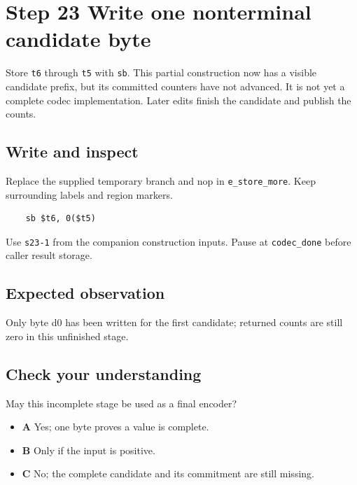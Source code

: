 \section{Step 23 Write one nonterminal candidate byte}\label{delta-s23}

Store \texttt{t6} through \texttt{t5} with \texttt{sb}. This partial construction now has a visible candidate prefix, but its committed counters have not advanced. It is not yet a complete codec implementation. Later edits finish the candidate and publish the counts.

\subsection{Write and inspect}
Replace the supplied temporary branch and nop in \texttt{e\_store\_more}. Keep surrounding labels and region markers.

\begin{verbatim}
    sb $t6, 0($t5)
\end{verbatim}
Use \texttt{s23-1} from the companion construction inputs. Pause at \texttt{codec\_done} before caller result storage.

\subsection{Expected observation}
Only byte d0 has been written for the first candidate; returned counts are still zero in this unfinished stage.

\subsection{Check your understanding}
May this incomplete stage be used as a final encoder?

\begin{itemize}
\item \textbf{A} Yes; one byte proves a value is complete.
\item \textbf{B} Only if the input is positive.
\item \textbf{C} No; the complete candidate and its commitment are still missing.
\end{itemize}
